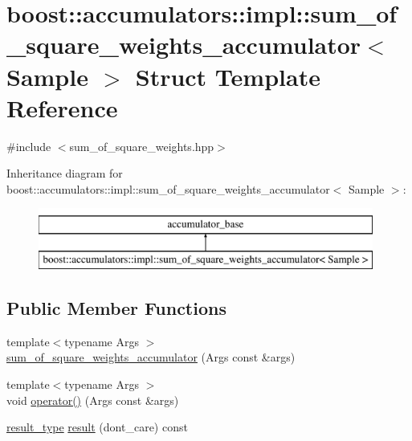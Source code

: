 \hypertarget{structboost_1_1accumulators_1_1impl_1_1sum__of__square__weights__accumulator}{}\section{boost\+:\+:accumulators\+:\+:impl\+:\+:sum\+\_\+of\+\_\+square\+\_\+weights\+\_\+accumulator$<$ Sample $>$ Struct Template Reference}
\label{structboost_1_1accumulators_1_1impl_1_1sum__of__square__weights__accumulator}


{\ttfamily \#include $<$sum\+\_\+of\+\_\+square\+\_\+weights.\+hpp$>$}

Inheritance diagram for boost\+:\+:accumulators\+:\+:impl\+:\+:sum\+\_\+of\+\_\+square\+\_\+weights\+\_\+accumulator$<$ Sample $>$\+:\begin{figure}[H]
\begin{center}
\leavevmode
\includegraphics[height=2.000000cm]{structboost_1_1accumulators_1_1impl_1_1sum__of__square__weights__accumulator}
\end{center}
\end{figure}
\subsection*{Public Member Functions}
\begin{DoxyCompactItemize}
\item 
{\footnotesize template$<$typename Args $>$ }\\\hyperlink{structboost_1_1accumulators_1_1impl_1_1sum__of__square__weights__accumulator_a25e5303bcf9f1136290fa80321c328b1}{sum\+\_\+of\+\_\+square\+\_\+weights\+\_\+accumulator} (Args const \&args)
\item 
{\footnotesize template$<$typename Args $>$ }\\void \hyperlink{structboost_1_1accumulators_1_1impl_1_1sum__of__square__weights__accumulator_a052432b8ef1d629762aa19a582d7b60a}{operator()} (Args const \&args)
\item 
\hyperlink{structboost_1_1accumulators_1_1impl_1_1sum__of__square__weights__accumulator_ab0a1d0065251cac2102de3263086cb09}{result\+\_\+type} \hyperlink{structboost_1_1accumulators_1_1impl_1_1sum__of__square__weights__accumulator_a3611a3f12c9e842e90d5d883ced69b3b}{result} (dont\+\_\+care) const 
\end{DoxyCompactItemize}
